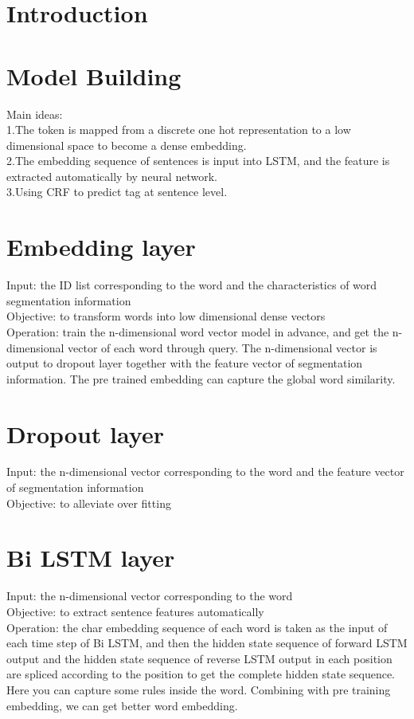 \section{Introduction}\label{sec-intro}


\begin{JournalOnly}
\end{JournalOnly}
\section{Model Building} \label{sec-conclusions}
Main ideas:\\
1.The token is mapped from a discrete one hot representation to a low dimensional space to become a dense embedding.\\
2.The embedding sequence of sentences is input into LSTM, and the feature is extracted automatically by neural network.\\
3.Using CRF to predict tag at sentence level.
\section{Embedding layer} \label{sec-conclusions}
Input: the ID list corresponding to the word and the characteristics of word segmentation information\\
Objective: to transform words into low dimensional dense vectors\\
Operation: train the n-dimensional word vector model in advance, and get the n-dimensional vector of each word through query. The n-dimensional vector is output to dropout layer together with the feature vector of segmentation information.
The pre trained embedding can capture the global word similarity.
\section{Dropout layer} \label{sec-conclusions}
Input: the n-dimensional vector corresponding to the word and the feature vector of segmentation information\\
Objective: to alleviate over fitting
\section{Bi LSTM layer} \label{sec-conclusions}
Input: the n-dimensional vector corresponding to the word\\
Objective: to extract sentence features automatically\\
Operation: the char embedding sequence of each word is taken as the input of each time step of Bi LSTM, and then the hidden state sequence of forward LSTM output and the hidden state sequence of reverse LSTM output in each position are spliced according to the position to get the complete hidden state sequence.
Here you can capture some rules inside the word. Combining with pre training embedding, we can get better word embedding.

